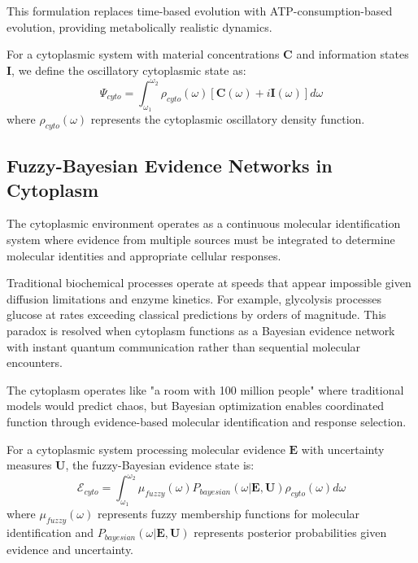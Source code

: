 \documentclass[11pt,a4paper]{article}
\begin{document}
This formulation replaces time-based evolution with ATP-consumption-based evolution, providing metabolically realistic dynamics.

\begin{definition}
For a cytoplasmic system with material concentrations $\mathbf{C}$ and information states $\mathbf{I}$, we define the oscillatory cytoplasmic state as:
\begin{equation}
\Psi_{cyto} = \int_{\omega_1}^{\omega_2} \rho_{cyto}(\omega) [\mathbf{C}(\omega) + i\mathbf{I}(\omega)] d\omega
\end{equation}
where $\rho_{cyto}(\omega)$ represents the cytoplasmic oscillatory density function.
\end{definition}

\subsection{Fuzzy-Bayesian Evidence Networks in Cytoplasm}

The cytoplasmic environment operates as a continuous molecular identification system where evidence from multiple sources must be integrated to determine molecular identities and appropriate cellular responses.

\begin{theorem}
Traditional biochemical processes operate at speeds that appear impossible given diffusion limitations and enzyme kinetics. For example, glycolysis processes glucose at rates exceeding classical predictions by orders of magnitude. This paradox is resolved when cytoplasm functions as a Bayesian evidence network with instant quantum communication rather than sequential molecular encounters.
\end{theorem}

The cytoplasm operates like "a room with 100 million people" where traditional models would predict chaos, but Bayesian optimization enables coordinated function through evidence-based molecular identification and response selection.

\begin{definition}
For a cytoplasmic system processing molecular evidence $\mathbf{E}$ with uncertainty measures $\mathbf{U}$, the fuzzy-Bayesian evidence state is:
\begin{equation}
\mathcal{E}_{cyto} = \int_{\omega_1}^{\omega_2} \mu_{fuzzy}(\omega) P_{bayesian}(\omega | \mathbf{E}, \mathbf{U}) \rho_{cyto}(\omega) d\omega
\end{equation}
where $\mu_{fuzzy}(\omega)$ represents fuzzy membership functions for molecular identification and $P_{bayesian}(\omega | \mathbf{E}, \mathbf{U})$ represents posterior probabilities given evidence and uncertainty.
\end{definition}
\end{document}
